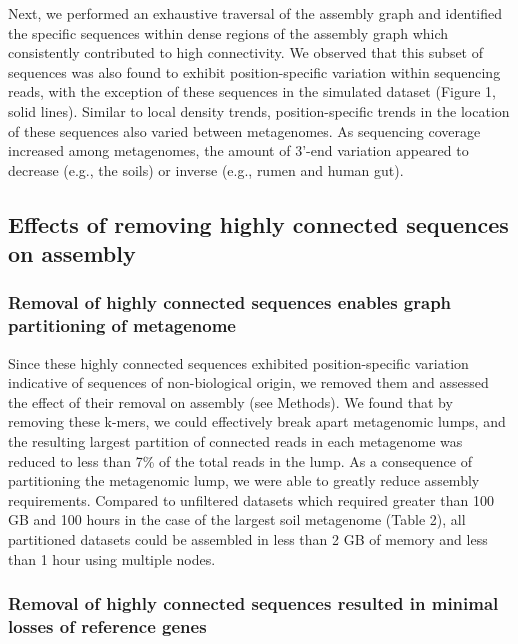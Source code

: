 \documentclass[10pt]{article}
\begin{document}
Next, we performed an exhaustive traversal of the assembly graph and
identified the specific sequences within dense regions of the assembly
graph which consistently contributed to high connectivity.  We
observed that this subset of sequences was also found to exhibit
position-specific variation within sequencing reads, with the
exception of these sequences in the simulated dataset (Figure 1, solid
lines).  Similar to local density trends, position-specific trends in
the location of these sequences also varied between metagenomes.  As
sequencing coverage increased among metagenomes, the amount of 3'-end
variation appeared to decrease (e.g., the soils) or inverse (e.g.,
rumen and human gut).

\subsection*{Effects of removing highly connected sequences on assembly}

\subsubsection*{Removal of highly connected sequences enables graph partitioning of metagenome}

Since these highly connected sequences exhibited position-specific
variation indicative of sequences of non-biological origin, we removed
them and assessed the effect of their removal on assembly
(see Methods).  We
found that by removing these k-mers, we could effectively break apart
metagenomic lumps, and the resulting largest partition of connected
reads in each metagenome was reduced to less than 7\% of the total
reads in the lump.  As a consequence of partitioning the metagenomic
lump, we were able to greatly reduce assembly requirements.
Compared
to unfiltered datasets which required greater than 100 GB and 100
hours in the case of the largest soil metagenome (Table 2), all
partitioned datasets could be assembled in less than 2 GB of memory
and less than 1 hour using multiple nodes.

\subsubsection*{Removal of highly connected sequences resulted in minimal losses of reference genes}
\end{document}
